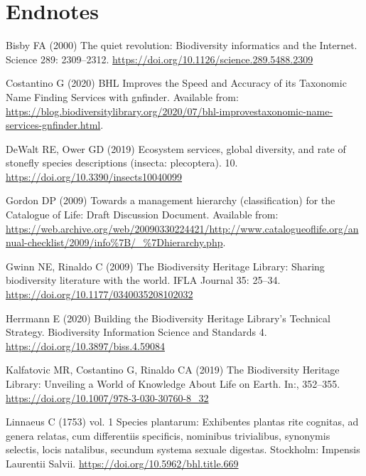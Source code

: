 \documentclass[
]{article}
\newlength{\cslhangindent}
\newlength{\cslentryspacingunit} %
\newenvironment{CSLReferences}[2] %
 {%
  \setlength{\parindent}{0pt}
  \ifodd #1
  \let\oldpar\par
  \def\par{\hangindent=\cslhangindent\oldpar}
  \fi
  \setlength{\parskip}{#2\cslentryspacingunit}
 }%
 {}
\begin{document}
\hypertarget{endnotes}{%
\section*{Endnotes}\label{endnotes}}

\hypertarget{refs}{}
\begin{CSLReferences}{1}{0}
\leavevmode{}%
Bisby FA (2000) {The quiet revolution: Biodiversity informatics and the
Internet}. Science 289: 2309--2312.
\url{https://doi.org/10.1126/science.289.5488.2309}

\leavevmode{}%
Costantino G (2020) {BHL Improves the Speed and Accuracy of its
Taxonomic Name Finding Services with gnfinder}. Available from:
\url{https://blog.biodiversitylibrary.org/2020/07/bhl-improvestaxonomic-name-services-gnfinder.html}.

\leavevmode{}%
DeWalt RE, Ower GD (2019) Ecosystem services, global diversity, and rate
of stonefly species descriptions (insecta: plecoptera). 10.
\url{https://doi.org/10.3390/insects10040099}

\leavevmode{}%
Gordon DP (2009) {Towards a management hierarchy (classification) for
the Catalogue of Life: Draft Discussion Document}. Available from:
\url{https://web.archive.org/web/20090330224421/http://www.catalogueoflife.org/annual-checklist/2009/info\%7B/_\%7Dhierarchy.php}.

\leavevmode{}%
Gwinn NE, Rinaldo C (2009) {The Biodiversity Heritage Library: Sharing
biodiversity literature with the world}. IFLA Journal 35: 25--34.
\url{https://doi.org/10.1177/0340035208102032}

\leavevmode{}%
Herrmann E (2020) {Building the Biodiversity Heritage Library's
Technical Strategy}. Biodiversity Information Science and Standards 4.
\url{https://doi.org/10.3897/biss.4.59084}

\leavevmode{}%
Kalfatovic MR, Costantino G, Rinaldo CA (2019) {The Biodiversity
Heritage Library: Unveiling a World of Knowledge About Life on Earth}.
In:, 352--355. \url{https://doi.org/10.1007/978-3-030-30760-8_32}

\leavevmode{}%
Linnaeus C (1753) vol. 1 Species plantarum: Exhibentes plantas rite
cognitas, ad genera relatas, cum differentiis specificis, nominibus
trivialibus, synonymis selectis, locis natalibus, secundum systema
sexuale digestas. Stockholm: Impensis Laurentii Salvii.
\url{https://doi.org/10.5962/bhl.title.669}


\end{CSLReferences}
\end{document}
